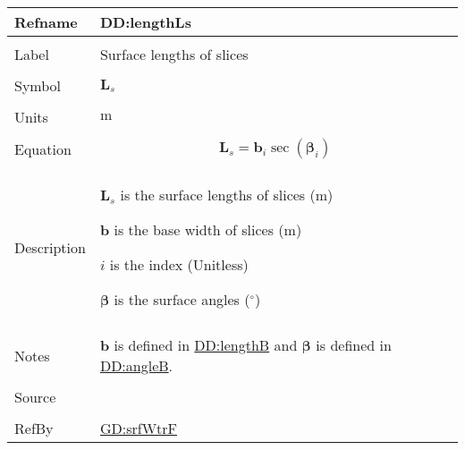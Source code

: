 \documentclass[12pt]{article}
\begin{document}
\vspace{\baselineskip}
\noindent
\begin{minipage}{\textwidth}
\begin{tabular}{>{\raggedright}p{}>{\raggedright\arraybackslash}p{}}
\toprule \textbf{Refname} & \textbf{DD:lengthLs}
\label{DD:lengthLs}
\\ \midrule \\
Label & Surface lengths of slices
        
\\ \midrule \\
Symbol & ${\symbf{L}_{s}}$
         
\\ \midrule \\
Units & ${\text{m}}$
        
\\ \midrule \\
Equation & \begin{displaymath}
           {\symbf{L}_{s}}={\symbf{b}}_{i} \sec\left({\symbf{β}}_{i}\right)
           \end{displaymath}
\\ \midrule \\
Description & \begin{symbDescription}
              \item{${\symbf{L}_{s}}$ is the surface lengths of slices (${\text{m}}$)}
              \item{$\symbf{b}$ is the base width of slices (${\text{m}}$)}
              \item{$i$ is the index (Unitless)}
              \item{$\symbf{β}$ is the surface angles (${{}^{\circ}}$)}
              \end{symbDescription}
\\ \midrule \\
Notes & $\symbf{b}$ is defined in \hyperref[DD:lengthB]{DD:lengthB} and $\symbf{β}$ is defined in \hyperref[DD:angleB]{DD:angleB}.
        
\\ \midrule \\
Source & \cite{fredlund1977}
         
\\ \midrule \\
RefBy & \hyperref[GD:srfWtrF]{GD:srfWtrF}
        
\\ \bottomrule
\end{tabular}
\end{minipage}
\end{document}

